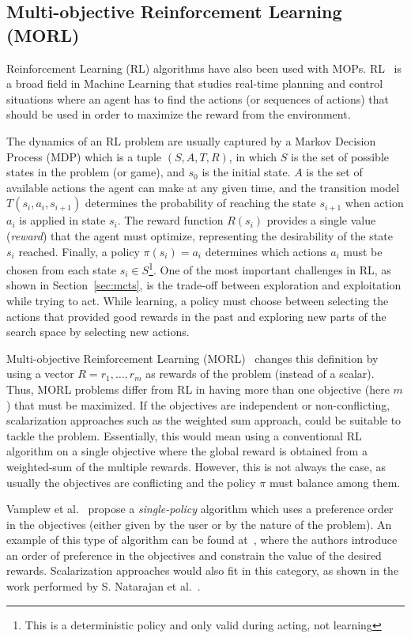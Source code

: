 \documentclass[journal]{IEEEtran}
\begin{document}
\subsection{Multi-objective Reinforcement Learning (MORL)}

Reinforcement Learning (RL) algorithms have also been used with MOPs. RL~\cite{Sutton1998} is a broad field in Machine Learning that studies real-time planning and control situations where an agent has to find the actions (or sequences of actions) that should be used in order to maximize the reward from the environment. 

The dynamics of an RL problem are usually captured by a Markov Decision Process (MDP) which is a tuple $(S, A, T, R)$, in which $S$ is the set of possible states in the problem (or game), and $s_0$ is the initial state. $A$ is the set of available actions the agent can make at any given time, and the transition model $T(s_i, a_i, s_{i+1})$ determines the probability of reaching the state $s_{i+1}$ when action $a_i$ is applied in state $s_i$. The reward function $R(s_i)$ provides a single value (\textit{reward}) that the agent must optimize, representing the desirability of the state $s_i$ reached. Finally, a policy $\pi(s_i) = a_i$ determines which actions $a_i$ must be chosen from each state $s_i \in S$\footnote{This is a deterministic policy and only valid during acting, not learning}. One of the most important challenges in RL, as shown in Section~\ref{sec:mcts}, is the trade-off between exploration and exploitation while trying to act. While learning, a policy must choose between selecting the actions that provided good rewards in the past and exploring new parts of the search space by selecting new actions. 

Multi-objective Reinforcement Learning (MORL)~\cite{Vamplew2010} changes this definition by using a vector $R = {r_1, \dots, r_m}$ as rewards of the problem (instead of a scalar). Thus, MORL problems differ from RL in having more than one objective (here $m$) that must be maximized. If the objectives are independent or non-conflicting, scalarization approaches such as the weighted sum approach, could be suitable to tackle the problem. Essentially, this would mean using a conventional RL algorithm on a single objective where the global reward is obtained from a weighted-sum of the multiple rewards. However, this is not always the case, as usually the objectives are conflicting and the policy $\pi$ must balance among them.

Vamplew et al.~\cite{Vamplew2010} propose a \textit{single-policy} algorithm which uses a preference order in the objectives (either given by the user or by the nature of the problem). 
An example of this type of algorithm can be found at~\cite{Gabor1998}, where the authors introduce an order of preference in the objectives and constrain the value of the desired rewards. Scalarization approaches would also fit in this category, as shown in the work performed by S. Natarajan et al.~\cite{Natarajan2005}.
\end{document}
